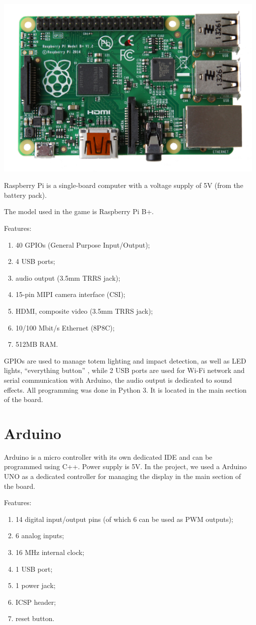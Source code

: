\documentclass[a4paper,twoside]{book}
\begin{document}
\begin{appendices}
\includegraphics[width=0.5\linewidth]{img/RPi}

Raspberry Pi is a single-board computer with a voltage supply of 5V (from the battery pack).

The model used in the game is Raspberry Pi B+.

\beforelist Features:
\begin{enumerate}
\item 40 GPIOs (General Purpose Input/Output);
\item 4 USB ports;
\item audio output (3.5mm TRRS jack);
\item 15-pin MIPI camera interface (CSI);
\item HDMI, composite video (3.5mm TRRS jack);
\item 10/100 Mbit/s Ethernet (8P8C);
\item 512MB RAM.
\end{enumerate}
\afterlist*
GPIOs are used to manage totem lighting and impact detection, as well as  LED lights, \textquotedblleft{}everything button\textquotedblright{} , while 2 USB ports are used for Wi-Fi network and serial communication with Arduino, the audio output is dedicated to sound effects. All programming was done in Python 3.
It is located in the main section of the board.

\section{Arduino}
\label{app:Arduino}
Arduino is a micro controller with its own dedicated IDE and can be programmed using C++. Power supply is 5V. In the project, we used a Arduino UNO as a dedicated controller for managing the display in the main section of the board. 

\beforelist Features:
\begin{enumerate}
\item 14 digital input/output pins (of which 6 can be used as PWM outputs);
\item 6 analog inputs;
\item 16 MHz internal clock;
\item 1 USB port;
\item 1 power jack;
\item ICSP header;
\item reset button.
\end{enumerate} 
\afterlist*


\end{appendices}
\end{document}

